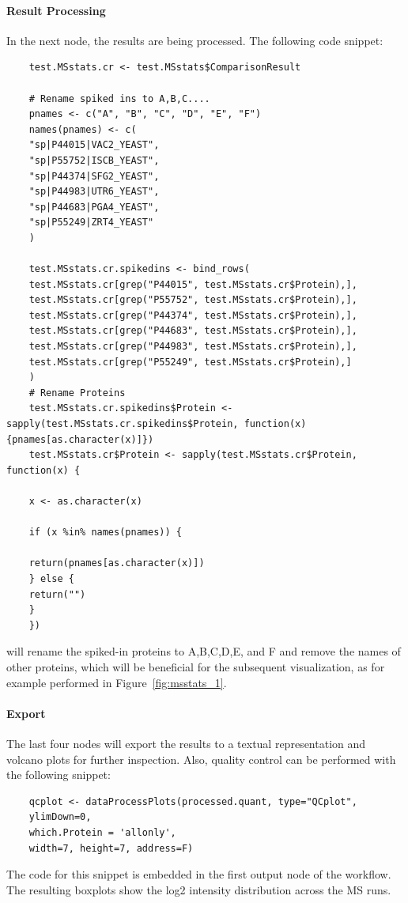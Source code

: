 \paragraph{Result Processing}
In the next node, the results are being processed. The following code snippet:
\begin{lstlisting}
	test.MSstats.cr <- test.MSstats$ComparisonResult
	
	# Rename spiked ins to A,B,C....
	pnames <- c("A", "B", "C", "D", "E", "F")
	names(pnames) <- c(
	"sp|P44015|VAC2_YEAST",
	"sp|P55752|ISCB_YEAST",
	"sp|P44374|SFG2_YEAST",
	"sp|P44983|UTR6_YEAST",
	"sp|P44683|PGA4_YEAST",
	"sp|P55249|ZRT4_YEAST"
	)
	
	test.MSstats.cr.spikedins <- bind_rows(
	test.MSstats.cr[grep("P44015", test.MSstats.cr$Protein),],
	test.MSstats.cr[grep("P55752", test.MSstats.cr$Protein),],
	test.MSstats.cr[grep("P44374", test.MSstats.cr$Protein),],
	test.MSstats.cr[grep("P44683", test.MSstats.cr$Protein),],
	test.MSstats.cr[grep("P44983", test.MSstats.cr$Protein),],
	test.MSstats.cr[grep("P55249", test.MSstats.cr$Protein),]
	)
	# Rename Proteins
	test.MSstats.cr.spikedins$Protein <- sapply(test.MSstats.cr.spikedins$Protein, function(x) {pnames[as.character(x)]})
	test.MSstats.cr$Protein <- sapply(test.MSstats.cr$Protein, function(x) {
	
	x <- as.character(x)
	
	if (x %in% names(pnames)) {
	
	return(pnames[as.character(x)]) 
	} else {
	return("")
	}
	})
\end{lstlisting}
will rename the spiked-in proteins to A,B,C,D,E, and F and remove the names of other proteins, which will be beneficial for the subsequent visualization, as
for example performed in Figure~\ref{fig:msstats_1}.


\paragraph{Export}
The last four nodes will export the results to a textual representation and volcano plots for further inspection. Also, quality control can be
performed with the following snippet:
\begin{lstlisting}
	qcplot <- dataProcessPlots(processed.quant, type="QCplot", 
	ylimDown=0, 
	which.Protein = 'allonly',
	width=7, height=7, address=F)
\end{lstlisting}
The code for this snippet is embedded in the first output node
of the workflow. The resulting boxplots show the log2 intensity distribution
across the MS runs.

